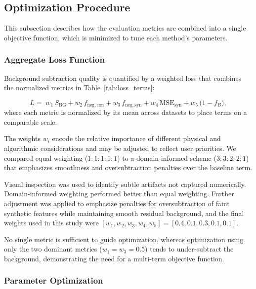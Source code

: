 \documentclass[11pt,onecolumn]{IEEEtran}
\begin{document}
\subsection{Optimization Procedure}

This subsection describes how the evaluation metrics are combined into a single objective function, which is minimized to tune each method's parameters.

\subsubsection{Aggregate Loss Function}

Background subtraction quality is quantified by a weighted loss that combines the normalized metrics in Table~\ref{tab:loss_terms}:

\begin{equation}
L =\;
w_1\, S_{\mathrm{BG}}
+ w_2\, f_{\mathrm{neg,con}}
+ w_3\, f_{\mathrm{neg,syn}}
+ w_4\, \mathrm{MSE}_{\mathrm{syn}}
+ w_5\, \bigl(1 - f_{B}\bigr),
\end{equation}
where each metric is normalized by its mean across datasets to place terms on a comparable scale.

The weights $w_i$ encode the relative importance of different physical and algorithmic considerations and may be adjusted to reflect user priorities. We compared equal weighting ($1\!:\!1\!:\!1\!:\!1\!:\!1$) to a domain-informed scheme ($3\!:\!3\!:\!2\!:\!2\!:\!1$) that emphasizes smoothness and oversubtraction penalties over the baseline term.

Visual inspection was used to identify subtle artifacts not captured numerically. Domain-informed weighting performed better than equal weighting. Further adjustment was applied to emphasize penalties for oversubtraction of faint synthetic features while maintaining smooth residual background, and the final weights used in this study were $[w_1,w_2,w_3,w_4,w_5]=[0.4,0.1,0.3,0.1,0.1]$.


No single metric is sufficient to guide optimization, whereas optimization using only the two dominant metrics ($w_1 = w_3 = 0.5$) tends to under-subtract the background, demonstrating the need for a multi-term objective function.

\subsubsection{Parameter Optimization}
\end{document}

